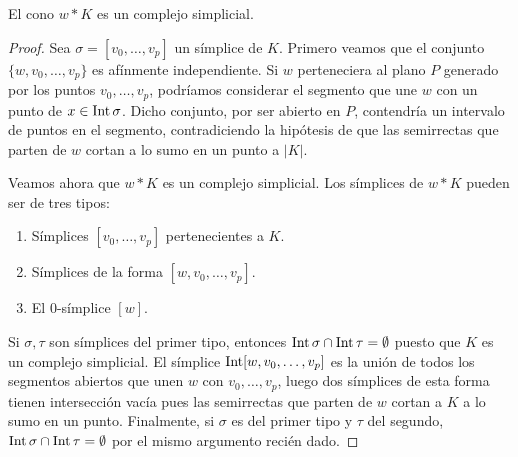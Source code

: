 \begin{lema}
	El cono $w \ast K$ es un complejo simplicial.
\end{lema}
\begin{proof}
	Sea $\sigma = [v_{0},\ldots,v_{p}]$ un símplice de $K$. Primero veamos que el
	conjunto $\{w,v_{0},\ldots,v_{p}\}$ es afínmente independiente. Si $w$ perteneciera
	al plano $P$ generado por los puntos $v_{0},\ldots,v_{p}$, podríamos
	considerar el segmento que une $w$ con un punto de $x \in \operatorname{Int} \sigma$. Dicho
	conjunto, por ser abierto en $P$, contendría un intervalo de puntos en el segmento,
	contradiciendo la hipótesis de que las semirrectas que parten de $w$ cortan a
	lo sumo en un punto a $|K|$.
	
	Veamos ahora que $w \ast K$ es un complejo simplicial. Los símplices de $w \ast
	K$ pueden ser de tres tipos:
	\begin{enumerate}
		\item Símplices $[v_{0},\ldots, v_{p}]$ pertenecientes a $K$.
		
		\item Símplices de la forma $[w,v_{0},\ldots, v_{p}]$.
		
		\item El $0$-símplice $[w]$.
	\end{enumerate}
	Si $\sigma,\tau$ son símplices del primer tipo, entonces $\operatorname{Int} \sigma \cap
	\operatorname{Int} \tau = \emptyset$ puesto que $K$ es un complejo simplicial. El
	símplice $\operatorname{Int} [w,v_{0},\ldots,v_{p}]$ es la unión de todos los segmentos
	abiertos que unen $w$ con $v_{0},\ldots, v_{p}$, luego dos símplices de esta forma
	tienen intersección vacía pues las semirrectas que parten de $w$ cortan a $K$ a
	lo sumo en un punto. Finalmente, si $\sigma$ es del primer tipo y $\tau$ del segundo,
	$\operatorname{Int} \sigma \cap \operatorname{Int} \tau = \emptyset$ por el mismo argumento
	recién dado.
\end{proof}

